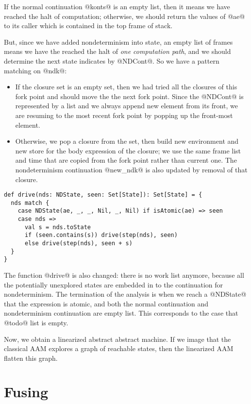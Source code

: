 \documentclass[acmsmall,review,anonymous]{acmart}\settopmatter{printfolios=true,printccs=false,printacmref=false}
\begin{document}
If the normal continuation @konts@ is an empty list, then it means we have reached
the halt of computation; otherwise, we should return the values of @ae@ to its
caller which is contained in the top frame of stack.

But, since we have added nondeterminism into state, an empty list of frames means
we have the reached the halt of \textit{one computation path}, and we should
determine the next state indicates by @NDCont@.
So we have a pattern matching on @ndk@:
\begin{itemize}
  \item If the closure set is an empty set,
then we had tried all the closures of this fork point and should move the the
next fork point. Since the @NDCont@ is represented by a list and we always
append new element from its front, we are resuming to the most recent fork point by
popping up the front-most element.
\item Otherwise, we pop a closure from the set, then build new
environment and new store for the body expression of the closure;
we use the same frame list and time that are copied from the fork point rather
than current one.
The nondeterminism continuation @new_ndk@ is also updated by removal of that closure.
\end{itemize}

\begin{lstlisting}
def drive(nds: NDState, seen: Set[State]): Set[State] = {
  nds match {
    case NDState(ae, _, _, Nil, _, Nil) if isAtomic(ae) => seen
    case nds =>
      val s = nds.toState
      if (seen.contains(s)) drive(step(nds), seen)
      else drive(step(nds), seen + s)
  }
}
\end{lstlisting}

The function @drive@ is also changed: there is no work list anymore, because all the
potentially unexplored states are embedded in to the continuation for
nondeterminism.
The termination of the analysis is when we reach a @NDState@ that the expression
is atomic, and both the normal continuation and nondeterminism continuation are
empty list. This corresponds to the case that @todo@ list is empty.

Now, we obtain a linearized abstract abstract machine. If we image that the classical
AAM explores a graph of reachable states, then the linearized AAM flatten this
graph.

\section{Fusing} \label{fusing}
\end{document}
